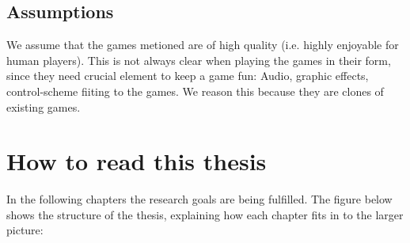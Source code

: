 \documentclass[a4paper,titlepage,final]{report}
\begin{document}
\subsection{Assumptions}
We assume that the games metioned are of high quality (i.e. highly enjoyable for human players). This is not always clear when playing the games in their form, since they need crucial element to keep a game fun: Audio, graphic effects, control-scheme fiiting to the games.
We reason this because they are clones of existing games.


\section{How to read this thesis}
In the following chapters the research goals are being fulfilled. 
The figure below shows the structure of the thesis, explaining how each chapter fits in to the larger picture:
\end{document}
